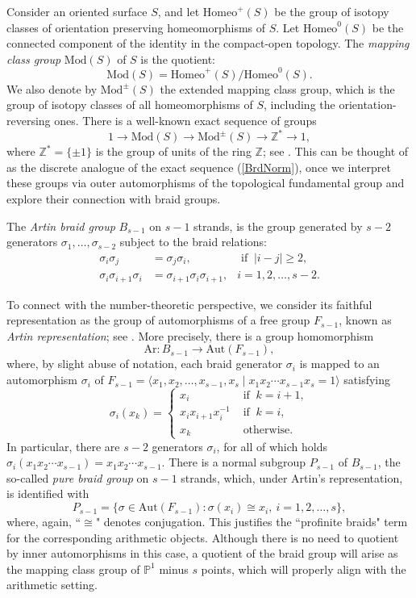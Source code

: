 \documentclass[10pt]{amsart}
\theoremstyle{definition}
\newcommand{\Z}{\mathbb{Z}}
\newcommand{\A}{{ \mathrm{Aut} }}
\begin{document}
Consider an oriented surface $S$, and let
$\mathrm{Homeo}^+(S)$ be the group of isotopy classes of orientation preserving homeomorphisms of $S$. Let $\mathrm{Homeo}^0(S)$
be the connected component of the identity in the compact-open topology.
The {\em mapping class group} $\mathrm{Mod}(S)$ of $S$ is the quotient:
\[
\mathrm{Mod}(S)=\mathrm{Homeo}^+(S)/\mathrm{Homeo}^0(S).
\]
We also denote by $\mathrm{Mod}^{\pm}(S)$ the extended mapping class group, which is the group of isotopy classes of all homeomorphisms of $S$, including the orientation-reversing ones. 
There is a well-known exact sequence of groups
  \begin{equation}
    \label{eq:sesMod}
    1  \rightarrow \mathrm{Mod}(S) \rightarrow \mathrm{Mod}^{\pm}(S)
    \rightarrow \Z^* \rightarrow 1,
  \end{equation}
where $\Z^*=\{\pm 1\}$ is the group of units of the ring $\Z$; see \cite[ch. 8]{FarbMagalit}. This can be thought of as the discrete analogue of the exact sequence (\ref{BrdNorm}), once we interpret these groups via outer automorphisms of the topological fundamental group and explore their connection with braid groups. 

The {\em Artin braid group} $B_{s-1}$ on $s-1$ strands, is the group generated by $s-2$ generators $\sigma_1,\ldots,\sigma_{s-2}$ subject to the braid relations:
\begin{align*}
    \sigma_i\sigma_j &= \sigma_j \sigma_i, & \textrm{ if } \ |i-j|\geq 2, \\
    \sigma_i \sigma_{i+1}\sigma_i &= \sigma_{i+1}\sigma_i\sigma_{i+1}, & i =1,2,\ldots,s-2.
\end{align*}

To connect with the number-theoretic perspective, we consider its faithful representation as the group of automorphisms of a free group $F_{s-1}$, known as {\em Artin representation}; see \cite[Cor. 1.8.3]{BirmanBraids}. More precisely, there is a group homomorphism
\[
  \mathrm{Ar}\colon B_{s-1} \to \mathrm{Aut}(F_{s-1}),
\]
where, by slight abuse of notation, each braid generator $\sigma_i$ is mapped to an automorphism $\sigma_i$ of $F_{s-1} = \langle x_1,x_2,\ldots,x_{s-1},x_s \mid x_1x_2\cdots x_{s-1}x_s=1\rangle $ satisfying
\[\sigma_i(x_k) = \begin{cases} 
x_i & \textrm{ if } \ k=i+1, \\
x_i x_{i+1}x_i^{-1} & \textrm{ if } \ k=i, \\
x_k & \textrm{ otherwise.}
\end{cases}\] 
In particular, there are $s-2$ generators $\sigma_i$, for all of which holds $\sigma_i(x_1x_2\cdots x_{s-1}) = x_1x_2\cdots x_{s-1}$. There is a normal subgroup $P_{s-1}$ of $B_{s-1}$, the so-called {\em pure braid group} on $s-1$ strands, which, under Artin's representation, is identified with
\[ P_{s-1} = \{ \sigma \in \A (F_{s-1}) : \sigma(x_i) \cong x_i, \  i=1,2,\ldots,s \},\] where, again, ``$\cong$" denotes conjugation. This justifies the ``profinite braids" term for the corresponding arithmetic objects. Although there is no need to quotient by inner automorphisms in this case, a quotient of the braid group will arise as the mapping class group of $\mathbb{P}^1$ minus $s$ points, which will properly align with the arithmetic setting.  
\end{document}
